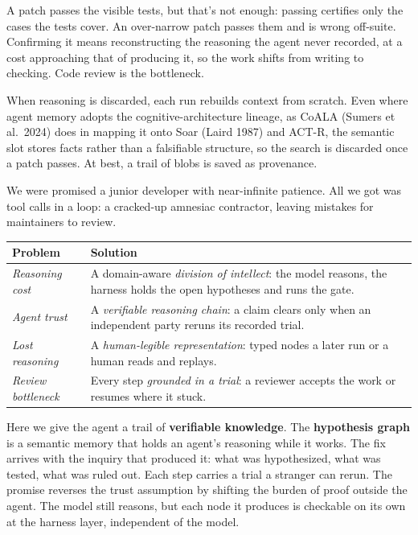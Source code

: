 \documentclass[
  10pt,
]{article}
\newcounter{none} %
\begin{document}
A patch passes the visible tests, but that's not enough: passing
certifies only the cases the tests cover. An over-narrow patch passes
them and is wrong off-suite. Confirming it means reconstructing the
reasoning the agent never recorded, at a cost approaching that of
producing it, so the work shifts from writing to checking. Code review
is the bottleneck.

When reasoning is discarded, each run rebuilds context from scratch.
Even where agent memory adopts the cognitive-architecture lineage, as
CoALA (Sumers et al.~2024) does in mapping it onto Soar (Laird 1987) and
ACT-R, the semantic slot stores facts rather than a falsifiable
structure, so the search is discarded once a patch passes. At best, a
trail of blobs is saved as provenance.

We were promised a junior developer with near-infinite patience. All we
got was tool calls in a loop: a cracked-up amnesiac contractor, leaving
mistakes for maintainers to review.

{\def\LTcaptype{none} %
\begin{longtable}[]{@{}
  >{\raggedright\arraybackslash}p{}
  >{\raggedright\arraybackslash}p{}@{}}
\toprule\noalign{}
\begin{minipage}[b]{\linewidth}\raggedright
Problem
\end{minipage} & \begin{minipage}[b]{\linewidth}\raggedright
Solution
\end{minipage} \\
\midrule\noalign{}
\endhead
\bottomrule\noalign{}
\endlastfoot
\emph{Reasoning cost} & A domain-aware \emph{division of intellect}: the
model reasons, the harness holds the open hypotheses and runs the
gate. \\
\emph{Agent trust} & A \emph{verifiable reasoning chain}: a claim clears
only when an independent party reruns its recorded trial. \\
\emph{Lost reasoning} & A \emph{human-legible representation}: typed
nodes a later run or a human reads and replays. \\
\emph{Review bottleneck} & Every step \emph{grounded in a trial}: a
reviewer accepts the work or resumes where it stuck. \\
\end{longtable}
}

Here we give the agent a trail of \textbf{verifiable knowledge}. The
\textbf{hypothesis graph} is a semantic memory that holds an agent's
reasoning while it works. The fix arrives with the inquiry that produced
it: what was hypothesized, what was tested, what was ruled out. Each
step carries a trial a stranger can rerun. The promise reverses the
trust assumption by shifting the burden of proof outside the agent. The
model still reasons, but each node it produces is checkable on its own
at the harness layer, independent of the model.
\end{document}
